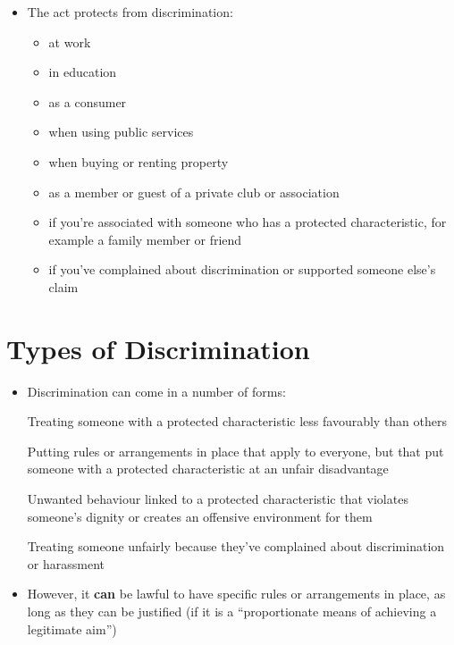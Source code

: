 \documentclass{article}
\begin{document}
\begin{itemize}
\item The act protects from discrimination:

\begin{itemize}
\item at work
\item in education
\item as a consumer
\item when using public services
\item when buying or renting property
\item as a member or guest of a private club or association
\item if you're associated with someone who has a protected characteristic, for example a family member or friend
\item if you've complained about discrimination or supported someone else’s claim
\end{itemize}
\end{itemize}



\section{Types of Discrimination}
\begin{itemize}
\item Discrimination can come in a number of forms:
\begin{definition}
Treating someone with a protected characteristic less favourably than others
\end{definition}
\begin{definition}
Putting rules or arrangements in place that apply to everyone, but that put someone with a protected characteristic at an unfair disadvantage
\end{definition}
\begin{definition}[Harassment]
Unwanted behaviour linked to a protected characteristic that violates someone's dignity or creates an offensive environment for them
\end{definition}
\begin{definition}[Victimisation]
Treating someone unfairly because they've complained about discrimination or harassment
\end{definition}

\item However, it {\bf can} be lawful to have specific rules or arrangements in place, as long as they can be justified (if it is a ``proportionate means of achieving a legitimate aim'')
\end{itemize}
\end{document}
